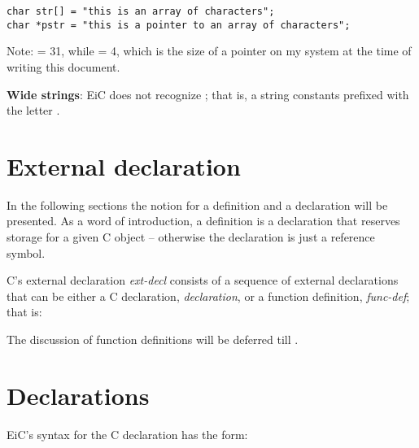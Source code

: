 \begin{production}
\begin{verbatim}
char str[] = "this is an array of characters";
char *pstr = "this is a pointer to an array of characters";
\end{verbatim}
\end{production}

Note:  = 31, while  = 4, which is the
size of a pointer on my system at the time of writing this document.

\begin{warning}

{\bf Wide strings}: EiC does not recognize ; that is, a string constants prefixed with
the letter .

\end{warning}


\section{External declaration}
\label{sec:ExternalDeclaration}

In the following sections the notion for a definition and a
declaration will be presented.  As a
word of introduction, a definition is a declaration that reserves
storage for a given C object -- otherwise the declaration is just a
reference symbol.

C's external declaration {\it ext-decl} consists of a sequence of
external declarations that can be either a C declaration, {\it
declaration}, or a function definition, {\it func-def}; that is:

\begin{quote} 
\end{quote}
 The discussion of function definitions will be deferred till .

\section{Declarations}
\label{sec:Declaration}

EiC's syntax for the C declaration has the form:
\begin{quote} 
\end{quote}



